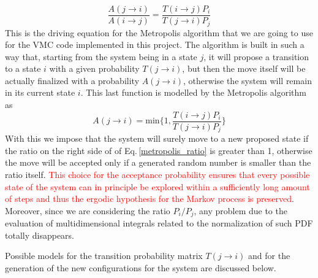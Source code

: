 \begin{equation}
    \frac{A(j\rightarrow i)}{A(i\rightarrow j)} =  \frac{ T(i\rightarrow j) P_i}{T(j\rightarrow i) P_j}
    \label{metropolis_ratio}
\end{equation}
This is the driving equation for the Metropolis algorithm that we are going to use for the VMC code implemented in this project. The algorithm is built in such a way that, starting from the system being in a state $j$, it will propose a transition to a state $i$ with a given probability $T(j\rightarrow i)$, but then the move itself will be actually finalized with a probability $A(j\rightarrow i)$, otherwise the system will remain in its current state $i$. This last function is modelled by the Metropolis algorithm as
\begin{equation}
    A(j\rightarrow i ) = \text{min} \bigg\{ 1, \frac{T(i \rightarrow j) P_i}{T(j\rightarrow i) P_j} \bigg\}
    \label{acceptance_ratio}
\end{equation}
With this we impose that the system will surely move to a new proposed state if the ratio on the right side of of Eq.\,\ref{metropolis_ratio} is greater than 1, otherwise the move will be accepted only if a generated random number is smaller than the ratio itself. \textcolor{red}{This choice for the acceptance probability ensures that every possible state of the system can in principle be explored within a sufficiently long amount of steps and thus the ergodic hypothesis for the Markov process is preserved}. Moreover, since we are considering the ratio $P_i/P_j$, any problem due to the evaluation of multidimensional integrals related to the normalization of such PDF totally disappears. 

Possible models for the transition probability matrix $T(j\rightarrow i)$ and for the generation of the new configurations for the system are discussed below.

